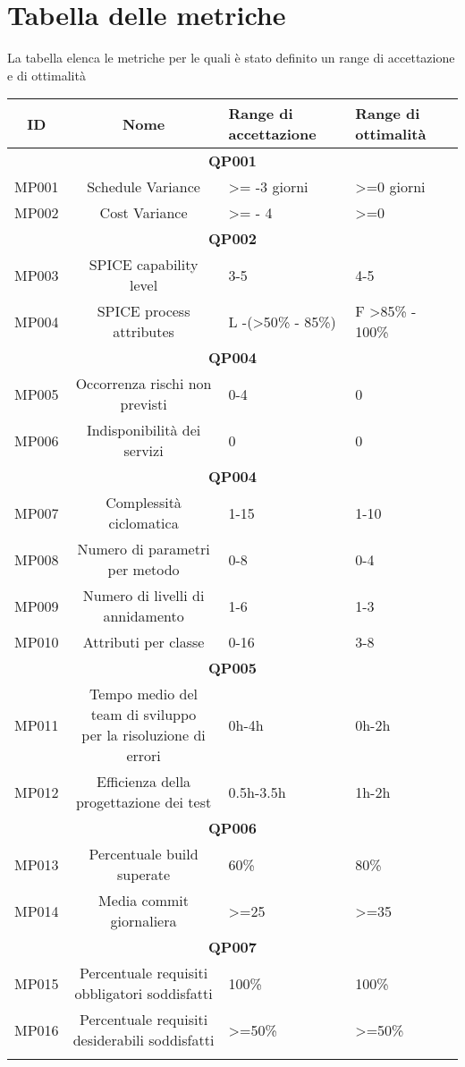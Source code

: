 \section{Tabella delle metriche}
\label{Tab2.2}
La tabella elenca le metriche per le quali è stato definito un range di accettazione e di ottimalità
\begin{tabularx}{\textwidth}{|c|c|X|X|}
	\hline 
	\textbf{ID} & \textbf{Nome} & \textbf{Range di accettazione}  & \textbf{Range di ottimalità}  \\ 
	\hline
	\multicolumn{4}{|c|}{\textbf{QP001}} \\
	\hline
	MP001 & Schedule Variance & >= -3 giorni & >=0 giorni \\ 
	\hline
	MP002 &Cost Variance& >= - 4 &  >=0 \\ 
	\hline
	\multicolumn{4}{|c|}{\textbf{QP002}} \\
	\hline
	MP003 & SPICE capability level & 3-5 & 4-5 \\ 
	\hline 
	MP004 & SPICE process attributes & L -(>50\% - 85\%)  & F >85\% - 100\% \\ 
	\hline
	\multicolumn{4}{|c|}{\textbf{QP004}} \\
	\hline 
	MP005 & Occorrenza rischi non previsti &   0-4 &0 \\
	\hline 
	MP006 & Indisponibilità dei servizi & 0   & 0 \\
	\hline
	\multicolumn{4}{|c|}{\textbf{QP004}} \\
	\hline
	MP007 & Complessità ciclomatica & 1-15 & 1-10 \\ 
	\hline 
	MP008 & Numero di parametri per metodo & 0-8 & 0-4 \\ 
	\hline 
	MP009& Numero di livelli di annidamento & 1-6 & 1-3 \\ 
	\hline 
	MP010 & Attributi per classe & 0-16 & 3-8 \\ 
	\hline 
	\multicolumn{4}{|c|}{\textbf{QP005}} \\
	\hline
	MP011 &\makecell{Tempo medio del team di sviluppo \\ per la risoluzione di errori} & 0h-4h & 0h-2h \\ 
	\hline 
	MP012 & Efficienza della progettazione dei test  & 0.5h-3.5h  & 1h-2h \\ 
	\hline 
	\multicolumn{4}{|c|}{\textbf{QP006}} \\
	\hline
	MP013 & Percentuale build superate& 60\% & 80\%\\
	\hline
	MP014 & Media commit giornaliera & >=25 & >=35\\
	\hline
	\multicolumn{4}{|c|}{\textbf{QP007}} \\
	\hline
	MP015& \makecell{Percentuale requisiti \\ obbligatori soddisfatti}& 100\% & 100\%  \\
	\hline
	MP016& \makecell{Percentuale requisiti \\ desiderabili soddisfatti}& >=50\% &>=50\% \\
	\hline
	\caption{Tabella delle metriche dei processi}
\end{tabularx}